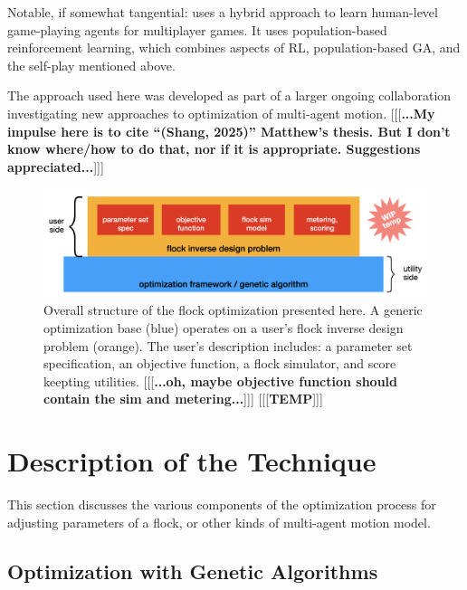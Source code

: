 \documentclass[letterpaper]{article}
\begin{document}
Notable, if somewhat tangential: \citet{jaderberg_human-level_2019} uses a hybrid approach to learn human-level game-playing agents for multiplayer games. It uses population-based reinforcement learning, which combines aspects of RL, population-based GA, and the self-play mentioned above.

The approach used here was developed as part of a larger ongoing collaboration investigating new approaches to optimization of multi-agent motion. [[[\textbf{...My impulse here is to cite ``(Shang, 2025)'' Matthew's thesis. But I don't know where/how to do that, nor if it is appropriate. Suggestions appreciated...}]]]


\begin{figure}[t]
    \centering
    \includegraphics[width=0.9\linewidth]{images/temp_system_blocks.png}
    \caption{Overall structure of the flock optimization presented here. A generic optimization base (blue) operates on a user's flock inverse design problem (orange). The user's description includes: a parameter set specification, an objective function, a flock simulator, and score keepting utilities. [[[\textbf{...oh, maybe objective function should contain the sim and metering...}]]] [[[\textbf{TEMP}]]]}
    \label{fig:system_blocks}
\end{figure}


\section{Description of the Technique}
\label{sec:Description}

This section discusses the various components of the optimization process for adjusting parameters of a flock, or other kinds of multi-agent motion model.


\subsection{Optimization with Genetic Algorithms}
\label{subsec:Optimization_with_GA}
\end{document}
